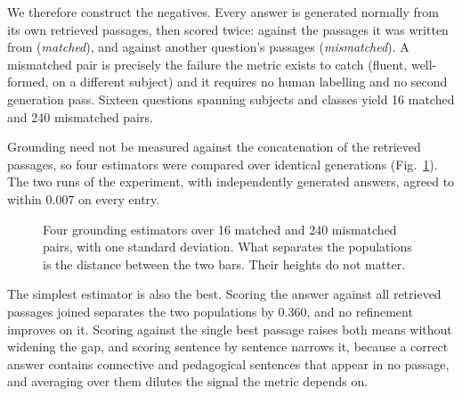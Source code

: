 We therefore construct the negatives. Every answer is generated normally from its own retrieved passages, then scored twice: against the passages it was written from (\emph{matched}), and against another question's passages (\emph{mismatched}). A mismatched pair is precisely the failure the metric exists to catch (fluent, well-formed, on a different subject) and it requires no human labelling and no second generation pass. Sixteen questions spanning subjects and classes yield 16 matched and 240 mismatched pairs.

Grounding need not be measured against the concatenation of the retrieved passages, so four estimators were compared over identical generations (Fig.~\ref{fig:estimators}). The two runs of the experiment, with independently generated answers, agreed to within 0.007 on every entry.


\begin{figure}
\centering
{}
\caption{Four grounding estimators over 16 matched and 240 mismatched pairs, with one standard deviation. What separates the populations is the distance between the two bars. Their heights do not matter.}
\label{fig:estimators}
\end{figure}

The simplest estimator is also the best. Scoring the answer against all retrieved passages joined separates the two populations by 0.360, and no refinement improves on it. Scoring against the single best passage raises both means without widening the gap, and scoring sentence by sentence narrows it, because a correct answer contains connective and pedagogical sentences that appear in no passage, and averaging over them dilutes the signal the metric depends on.

